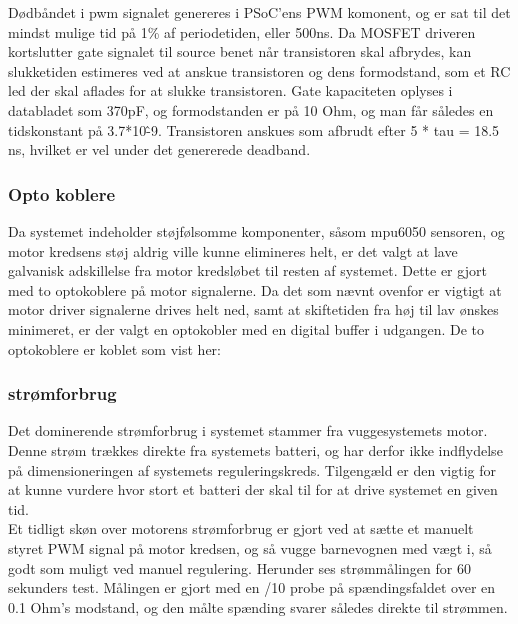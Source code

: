 Dødbåndet i pwm signalet genereres i PSoC'ens PWM komonent, og er sat til det mindst mulige tid på 1\% af periodetiden, eller 500ns.
Da MOSFET driveren kortslutter gate signalet til source benet når transistoren skal afbrydes, kan slukketiden estimeres ved at anskue transistoren og dens formodstand, som et RC led der skal aflades for at slukke transistoren. Gate kapaciteten oplyses i databladet som 370pF, og formodstanden er på 10 Ohm, og man får således en tidskonstant på 3.7*10\^-9. Transistoren anskues som afbrudt efter 5 * tau = 18.5 ns, hvilket er vel under det genererede deadband. \\

\subsubsection{Opto koblere}
\label{Vuggesystem:optokoblere}
Da systemet indeholder støjfølsomme komponenter, såsom mpu6050 sensoren, og motor kredsens støj aldrig ville kunne elimineres helt, er det valgt at lave galvanisk adskillelse fra motor kredsløbet til resten af systemet. Dette er gjort med to optokoblere på motor signalerne. Da det som nævnt ovenfor er vigtigt at motor driver signalerne drives helt ned, samt at skiftetiden fra høj til lav ønskes minimeret, er der valgt en optokobler med en digital buffer i udgangen. De to optokoblere er koblet som vist her:\\

\subsubsection{strømforbrug}
Det dominerende strømforbrug i systemet stammer fra vuggesystemets motor. Denne strøm trækkes direkte fra systemets batteri, og har derfor ikke indflydelse på dimensioneringen af systemets reguleringskreds. Tilgengæld er den vigtig for at kunne vurdere hvor stort et batteri der skal til for at drive systemet en given tid.\\ 
Et tidligt skøn over motorens strømforbrug er gjort ved at sætte et manuelt styret PWM signal på motor kredsen, og så vugge barnevognen med vægt i, så godt som muligt ved manuel regulering. Herunder ses strømmålingen for 60 sekunders test. Målingen er gjort med en /10 probe på spændingsfaldet over en 0.1 Ohm's modstand, og den målte spænding svarer således direkte til strømmen.\\

